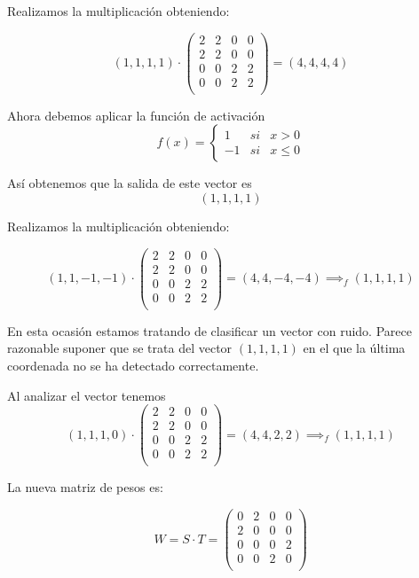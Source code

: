 \begin{problem}[8]
Realizamos la multiplicación obteniendo:

\[(1,1,1,1) \cdot \left( \begin{array}{cccc}
2 & 2 & 0 & 0 \\
2 & 2 & 0 & 0 \\
0 & 0 & 2 & 2 \\
0 & 0 & 2 & 2 \\
\end{array}\right) = (4,4,4,4)\]

Ahora debemos aplicar la función de activación
\[f(x) = \left\{\begin{array}{lll}1 & si & x>0 \\ -1 & si & x \leq 0 \end{array} \right.\]

Así obtenemos que la salida de este vector es
\[(1,1,1,1)\]

\spart

Realizamos la multiplicación obteniendo:

\[(1,1,-1,-1) \cdot \left( \begin{array}{cccc}
2 & 2 & 0 & 0 \\
2 & 2 & 0 & 0 \\
0 & 0 & 2 & 2 \\
0 & 0 & 2 & 2 \\
\end{array}\right) = (4,4,-4,-4) \implies_f (1,1,1,1)\]


\spart

En esta ocasión estamos tratando de clasificar un vector con ruido. Parece razonable suponer que se trata del vector $(1,1,1,1)$ en el que la última coordenada no se ha detectado correctamente.

Al analizar el vector tenemos
\[(1,1,1,0) \cdot \left( \begin{array}{cccc}
2 & 2 & 0 & 0 \\
2 & 2 & 0 & 0 \\
0 & 0 & 2 & 2 \\
0 & 0 & 2 & 2 \\
\end{array}\right) = (4,4,2,2) \implies_f (1,1,1,1)\]

\spart

La nueva matriz de pesos es:

\[W = S\cdot T = \left( \begin{array}{cccc}
0 & 2 & 0 & 0 \\
2 & 0 & 0 & 0 \\
0 & 0 & 0 & 2 \\
0 & 0 & 2 & 0 \\
\end{array}\right)\]


\end{problem}
